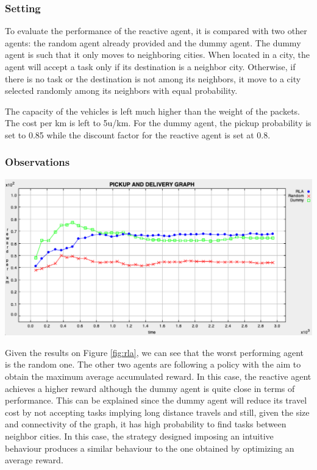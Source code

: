\documentclass[11pt]{article}
\begin{document}
\subsubsection{Setting}
To evaluate the performance of the reactive agent, it is compared with two other agents: the random agent already provided and the dummy agent. The dummy agent is such that it only moves to neighboring cities. When located in a city, the agent will accept a task only if its destination is a neighbor city. Otherwise, if there is no task or the destination is not among its neighbors, it move to a city selected randomly among its neighbors with equal probability. 

The capacity of the vehicles is left much higher than the weight of the packets. The cost per km is left to 5u/km. For the dummy agent, the pickup probability is set to 0.85 while the discount factor for the reactive agent is set at 0.8. 

\subsubsection{Observations}
\begin{minipage}[]{\textwidth}

\begin{minipage}[]{0.48\textwidth}
\includegraphics[width=\textwidth]{2-reactive/doc/plots/rla-dummy.png}
\label{fig:rla}
\end{minipage}
\hfill
\begin{minipage}[]{0.5\textwidth}
Given the results on Figure \ref{fig:rla}, we can see that the worst performing agent is the random one. The other two agents are following a policy with the aim to obtain the maximum average accumulated reward. In this case, the reactive agent achieves a higher reward although the dummy agent is quite close in terms of performance. This can be explained since the dummy agent will reduce its travel cost by not accepting tasks implying long distance travels and still, given the size and connectivity of the graph, it has high probability to find tasks between neighbor cities. In this case, the strategy designed imposing an intuitive behaviour produces a similar behaviour to the one obtained by optimizing an average reward. 
\end{minipage}

\end{minipage}
\end{document}
